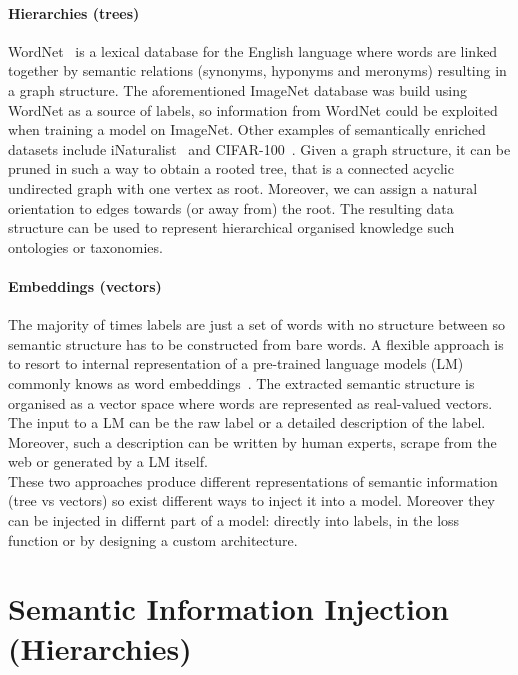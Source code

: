\paragraph{Hierarchies (trees)}
\label{par:hierarchies-tree}
WordNet~\cite{WordnetMi1995} is a lexical database for the English language
where words are linked together by semantic relations (synonyms, hyponyms and
meronyms) resulting in a graph structure. The aforementioned ImageNet database
was build using WordNet as a source of labels, so information from WordNet
could be exploited when training a model on ImageNet. Other examples of
semantically enriched datasets include
iNaturalist~\cite{TheInaturalistHorn2017} and
CIFAR-100~\cite{LearningMultipKrizhe2009}. Given a graph structure, it can be
pruned in such a way to obtain a rooted tree, that is a connected acyclic
undirected graph with one vertex as root. Moreover, we can assign a natural
orientation to edges towards (or away from) the root. The resulting data
structure can be used to represent hierarchical organised knowledge such
ontologies or taxonomies.

\paragraph{Embeddings (vectors)}
\label{par:embeddings-vectors}
The majority of times labels are just a set of words with no structure between
so semantic structure has to be constructed from bare words. A flexible
approach is to resort to internal representation of a pre-trained language
models (LM) commonly knows as word embeddings~\cite{BeyondWordEmbIncitt2023}.
The extracted semantic structure is organised as a vector space where words are
represented as real-valued vectors. The input to a LM can be the raw label or a
detailed description of the label. Moreover, such a description can be written
by human experts, scrape from the web or generated by a LM itself.\\

These two approaches produce different representations of semantic information
(tree vs vectors) so exist different ways to inject it into a model. Moreover
they can be injected in differnt part of a model: directly into labels, in the
loss function or by designing a custom architecture.

\section{Semantic Information Injection (Hierarchies)}

